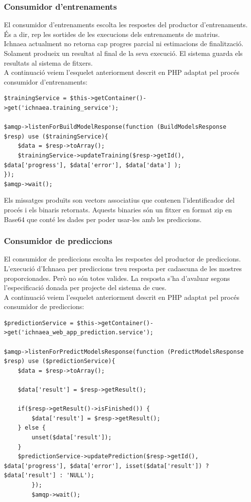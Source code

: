 \subsubsection{Consumidor d'entrenaments}
El consumidor d'entrenaments escolta les respostes del productor d'entrenaments. \'{E}s a dir, rep les sortides de les execucions dels entrenaments de matrius.\\

Ichnaea actualment no retorna cap progres parcial ni estimacions de finalitzaci\'{o}. Solament produeix un resultat al final de la seva execució. El sistema guarda els resultats al sistema de fitxers.\\

A continuació veiem l'esquelet anteriorment descrit en PHP adaptat pel proc\'{e}s consumidor d'entrenaments:

\begin{lstlisting}
$trainingService = $this->getContainer()->get('ichnaea.training_service');
		
$amqp->listenForBuildModelResponse(function (BuildModelsResponse $resp) use ($trainingService){
	$data = $resp->toArray();
	$trainingService->updateTraining($resp->getId(), $data['progress'], $data['error'], $data['data'] );
});
$amqp->wait();
\end{lstlisting}

Els missatges produïts son vectors associatius que contenen l'identificador del proc\'{e}s i els binaris retornats. Aquests binaries s\'{o}n un fitxer en format zip en Base64 que cont\'{e} les dades per poder usar-les amb les prediccions.

\subsubsection{Consumidor de prediccions}
El consumidor de prediccions escolta les respostes del productor de prediccions.\\

L'execució d'Ichnaea per prediccions treu resposta per cadascuna de les mostres proporcionades. Per\`{o} no s\'{o}n totes valides. La resposta s'ha d'avaluar segons l'especificació donada per projecte del sistema de cues.\\

A continuació veiem l'esquelet anteriorment descrit en PHP adaptat pel proc\'{e}s consumidor de prediccions:

\begin{lstlisting}
$predictionService = $this->getContainer()->get('ichnaea_web_app_prediction.service');
		
$amqp->listenForPredictModelsResponse(function (PredictModelsResponse $resp) use ($predictionService){
	$data = $resp->toArray();
	
	$data['result'] = $resp->getResult();

	if($resp->getResult()->isFinished()) {
 		$data['result'] = $resp->getResult();
	} else {
		unset($data['result']);
	}
	$predictionService->updatePrediction($resp->getId(), $data['progress'], $data['error'], isset($data['result']) ? $data['result'] : 'NULL');
		});
		$amqp->wait();
\end{lstlisting}

